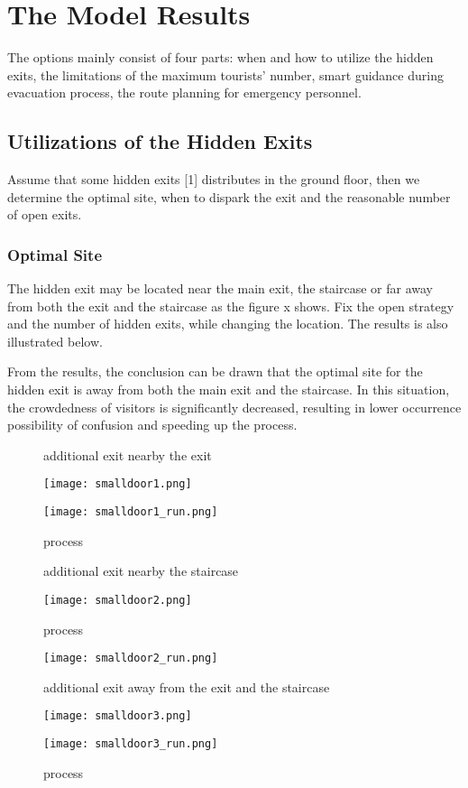 \documentclass{mcmthesis}
\begin{document}
\section{The Model Results}
\noindent The options mainly consist of four parts: when and how to utilize the hidden exits, the limitations of the maximum tourists' number, smart guidance during evacuation process, the route planning for emergency personnel.
\subsection{Utilizations of the Hidden Exits}
\noindent Assume that some hidden exits [1] distributes in the ground floor, then we determine the optimal site, when to dispark the exit and the reasonable number of open exits.
\subsubsection{Optimal Site}
\noindent The hidden exit may be located near the main exit, the staircase or far away from both the exit and the staircase as the figure x shows. Fix the open strategy and the number of hidden exits, while changing the location. The results is also illustrated below.
\par\indent From the results, the conclusion can be drawn that the optimal site for the hidden exit is away from both the main exit and the staircase. In this situation, the crowdedness of visitors is significantly decreased, resulting in lower occurrence possibility of confusion and speeding up the process.
\begin{figure}[htbp]
	\centering
	\begin{minipage}[htbp]{10.0cm}
		\centering
		\caption{additional exit nearby the exit}
		\texttt{[image: smalldoor1.png]}
	\end{minipage}
	\begin{minipage}[htbp]{10.0cm}
		\centering
		\caption{process}
		\texttt{[image: smalldoor1\_run.png]}
	\end{minipage}
\end{figure}
\begin{figure}[htbp]
	\begin{minipage}[htbp]{10.0cm}
		\centering
		\caption{additional exit nearby the staircase}
		\texttt{[image: smalldoor2.png]}
	\end{minipage}
	\centering
	\begin{minipage}[htbp]{10.0cm}
		\centering
		\caption{process}
		\texttt{[image: smalldoor2\_run.png]}
	\end{minipage}
	\begin{minipage}[htbp]{10.0cm}
		\centering
		\caption{additional exit away from the exit and the staircase}
		\texttt{[image: smalldoor3.png]}
	\end{minipage}
	\begin{minipage}[htbp]{10.0cm}
		\centering
		\caption{process}
		\texttt{[image: smalldoor3\_run.png]}
	\end{minipage}
\end{figure}
\newpage
\end{document}
